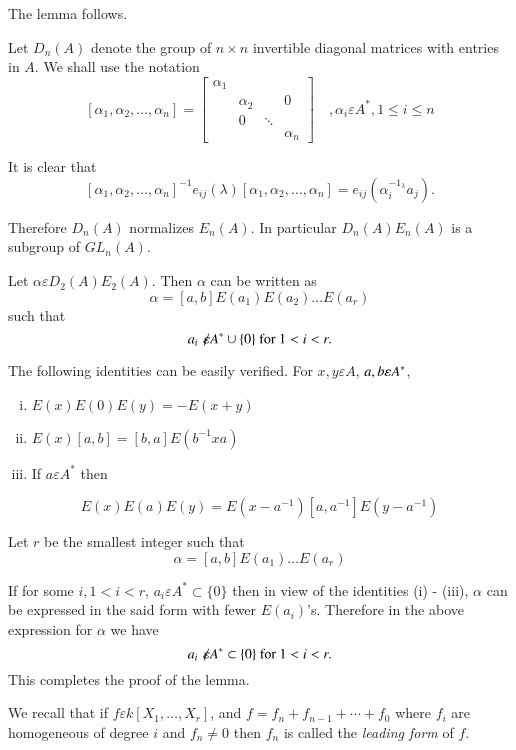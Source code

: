 The lemma follows.

Let $D_n(A)$ denote the group of $n\times n$ invertible diagonal
matrices with entries in $A$. We shall use the notation
$$
[\alpha_1,\alpha_2,\ldots,\alpha_n]=\begin{bmatrix}
\alpha_1 & & \\
& \alpha_2 & &0 \\
& 0 & \ddots & \\
& & & \alpha_n 
\end{bmatrix} \quad, \alpha_i\varepsilon A^{\ast}, 1\leq i \leq n
$$

It is clear that 
$$
[\alpha_1, \alpha_2,\ldots,\alpha_n]^{-1}e_{ij}(\lambda)[\alpha_1,\alpha_2,\ldots,\alpha_n]=e_{ij}\left(\alpha_{i}^{-1_\lambda}a_j\right).
$$

Therefore $D_n(A)$ normalizes $E_n(A)$. In particular $D_n(A)E_n(A)$
is a subgroup of $GL_n(A)$.

\begin{lem}\label{c1:lem3.2}
Let $\alpha\varepsilon D_2(A)E_2(A)$. Then $\alpha$ can be written as
$$
\alpha=[a,b]E(a_1)E(a_2)\ldots E(a_r)
$$
such that
$$
a_i\not\kern-2pt\varepsilon A^{\ast}\cup \{0\}\text{ for }1<i<r.
$$
\end{lem}

\begin{Proof}
The following identities can be easily verified. For $x, y \varepsilon
A$, $a,\\b \varepsilon A^{\ast}$,
\begin{enumerate}[(i)]
\item $E(x)E(0)E(y)=-E(x+y)$
\item $E(x)[a,b]=[b,a]E\left(b^{-1}xa\right)$
\item If $a\varepsilon A^{\ast}$ then
\end{enumerate}
$$
E(x)E(a)E(y)=E\left(x-a^{-1}\right)\left[a,a^{-1}\right]E\left(y-a^{-1}\right)
$$

Let $r$ be the smallest integer such that
$$
\alpha=[a,b]E(a_1)\ldots E(a_r)
$$

If for some $i,1<i<r$, $a_i\varepsilon A^{\ast} \subset \{0\}$ then in
view of the identities (i) - (iii), $\alpha$ can be expressed in the
said form with fewer $E(a_i)$'s. Therefore in the above expression for
$\alpha$ we have 
$$
a_i \not\kern-2pt\varepsilon A^{\ast}\subset \{0\}\text{ for }1<i<r.
$$
This completes the proof of the lemma.
\enprf
\end{Proof}

We recall that if $f\varepsilon k[X_1,\ldots, X_r]$, and
$f=f_n+f_{n-1}+\cdots+f_0$ where $f_i$ are homogeneous of degree $i$
and $f_n\neq 0$ then $f_n$ is called the \textit{leading form} of $f$.

